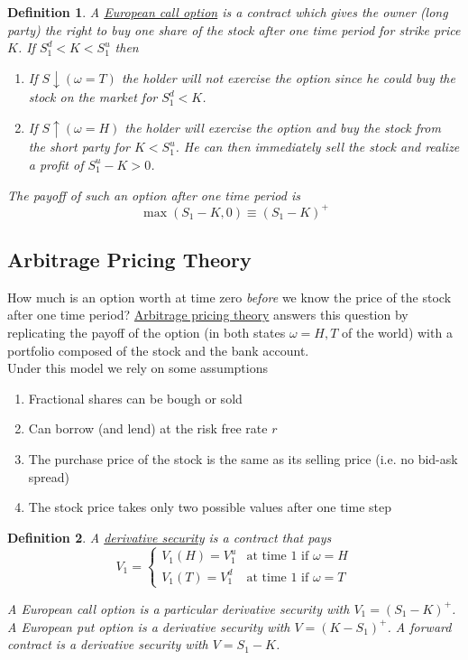 \documentclass[12pt]{article}
\newtheorem{definition}{Definition}
\newlength\tindent
\renewcommand{\indent}{\hspace*{\tindent}}
\begin{document}
\begin{definition} A \underline{European call option} is a contract which gives the owner (long party) the right to buy one share of the stock after one time period for strike price $K$. If $S^d_1 < K < S^u_1$ then
\begin{enumerate}[]
	\item If $S \downarrow (\omega = T)$ the holder will not exercise the option since he could buy the stock on the market for $S^d_1 < K$. 
	\item If $S \uparrow (\omega = H)$ the holder will exercise the option and buy the stock from the short party for $K < S^u_1$. He can then immediately sell the stock and realize a profit of $S^u_1 - K > 0$.
\end{enumerate}

The payoff of such an option after one time period is
\begin{equation*}
	\max \left( S_1 - K, 0 \right) \equiv (S_1 - K)^+
\end{equation*}
\end{definition}

\subsection{Arbitrage Pricing Theory}

\indent How much is an option worth at time zero {\em before} we know the price of the stock after one time period? \underline{Arbitrage pricing theory} answers this question by replicating the payoff of the option (in both states $\omega = H, T$ of the world) with a portfolio composed of the stock and the bank account. \\

Under this model we rely on some assumptions
\begin{enumerate}
	\item Fractional shares can be bough or sold
	\item Can borrow (and lend) at the risk free rate $r$
	\item The purchase price of the stock is the same as its selling price (i.e. no bid-ask spread)
	\item The stock price takes only two possible values after one time step
\end{enumerate}

\begin{definition} A \underline{derivative security} is a contract that pays
\begin{equation*}
	V_1 = 
	\begin{cases}
		V_1(H) = V^u_1 & \text{at time 1 if } \omega = H \\
		V_1(T) = V^d_1 & \text{at time 1 if } \omega = T
	\end{cases}
\end{equation*}
	
\indent A European call option is a particular derivative security with $V_1 = (S_1 - K)^+$. A European put option is a derivative security with $V = (K - S_1)^+$. A forward contract is a derivative security with $V = S_1 - K$.
\end{definition}
\end{document}
